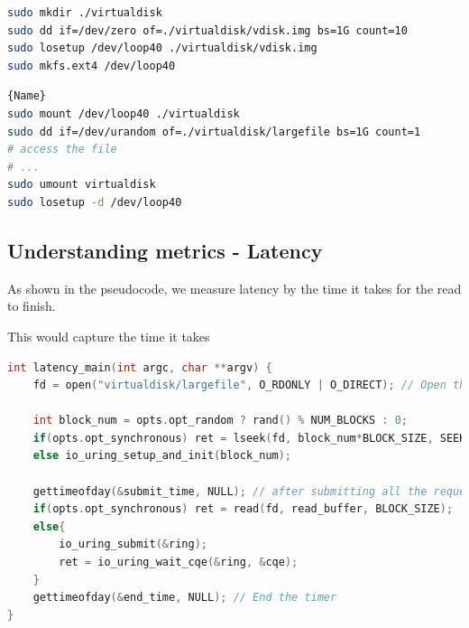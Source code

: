 \documentclass{article}
\begin{document}
\noindent\begin{minipage}{.45\textwidth}
    \begin{lstlisting}[language=Bash, caption=Create a Virtual disk, basicstyle=\tiny]
sudo mkdir ./virtualdisk
sudo dd if=/dev/zero of=./virtualdisk/vdisk.img bs=1G count=10
sudo losetup /dev/loop40 ./virtualdisk/vdisk.img
sudo mkfs.ext4 /dev/loop40 
    \end{lstlisting}
    \end{minipage}\hfill
    \begin{minipage}{.45\textwidth}
    \begin{lstlisting}[language=Bash, caption=mount and unmount when using,frame=tlrb, basicstyle=\tiny]{Name}
sudo mount /dev/loop40 ./virtualdisk
sudo dd if=/dev/urandom of=./virtualdisk/largefile bs=1G count=1
# access the file
# ...
sudo umount virtualdisk
sudo losetup -d /dev/loop40
    \end{lstlisting}
    \end{minipage}


\subsection{Understanding metrics - Latency}
As shown in the pseudocode, we measure latency by the time it takes for the read to finish.

This would capture the time it takes 

\begin{lstlisting}[language=C, caption=Psudocode, basicstyle=\tiny]
int latency_main(int argc, char **argv) {
    fd = open("virtualdisk/largefile", O_RDONLY | O_DIRECT); // Open the file

    int block_num = opts.opt_random ? rand() % NUM_BLOCKS : 0;
    if(opts.opt_synchronous) ret = lseek(fd, block_num*BLOCK_SIZE, SEEK_SET);
    else io_uring_setup_and_init(block_num);

    gettimeofday(&submit_time, NULL); // after submitting all the request
    if(opts.opt_synchronous) ret = read(fd, read_buffer, BLOCK_SIZE);
    else{
        io_uring_submit(&ring); 
        ret = io_uring_wait_cqe(&ring, &cqe);
    }
    gettimeofday(&end_time, NULL); // End the timer
}

\end{lstlisting}
\end{document}
